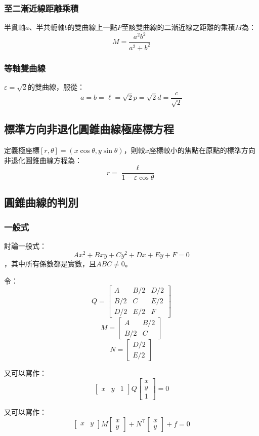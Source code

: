 \documentclass[a4paper,12pt]{article}
\begin{document}
\subsubsection{至二漸近線距離乘積}
半貫軸$a$、半共軛軸$b$的雙曲線上一點$P$至該雙曲線的二漸近線之距離的乘積$M$為：
\[M=\frac{a^2b^2}{a^2+b^2}\]
\subsubsection{等軸雙曲線}
$\varepsilon=\sqrt{2}$的雙曲線，服從：
\[a=b=\ell=\sqrt{2}p=\sqrt{2}d=\frac{c}{\sqrt{2}}\]
\subsection{標準方向非退化圓錐曲線極座標方程}
定義極座標$[r,\theta]=(x\cos\theta,y\sin\theta)$，則較$x$座標較小的焦點在原點的標準方向非退化圓錐曲線方程為：
\[r=\frac{\ell}{1-\varepsilon\cos\theta}\]
\subsection{圓錐曲線的判別}
\subsubsection{一般式}
討論一般式：
\[Ax^2+Bxy+Cy^2+Dx+Ey+F=0\]
，其中所有係數都是實數，且$ABC\neq 0$。

令：
\[Q=\begin{bmatrix} A & B/2 & D/2 \\ B/2 & C & E/2 \\ D/2 & E/2 & F \end{bmatrix}\]
\[ M =
\begin{bmatrix} A & B/2 \\ B/2 & C \end{bmatrix}\]
\[N =
\begin{bmatrix} D/2 \\ E/2 \end{bmatrix}\]

又可以寫作：
\[\begin{bmatrix} x & y & 1 \end{bmatrix}
Q\begin{bmatrix} x \\ y \\ 1 \end{bmatrix} = 0\]

又可以寫作：
\[\begin{bmatrix} x & y \end{bmatrix}
M\begin{bmatrix} x \\ y\end{bmatrix} + N^{\top}\begin{bmatrix} x \\ y\end{bmatrix} + f = 0\]
\end{document}

